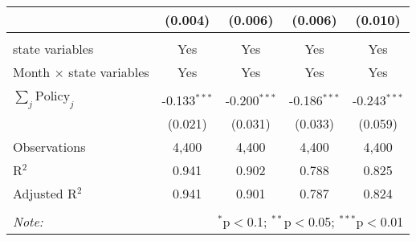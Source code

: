\begin{tabular}{@{\extracolsep{1pt}}lcccc}
  & (0.004) & (0.006) & (0.006) & (0.010) \\ 
 \hline \\[-1.8ex] 
state variables & Yes & Yes & Yes & Yes \\ 
Month $\times$ state variables & Yes & Yes & Yes & Yes \\ 
\hline \\[-1.8ex] 
$\sum_j \mathrm{Policy}_j$ & -0.133$^{***}$ & -0.200$^{***}$ & -0.186$^{***}$ & -0.243$^{***}$ \\ 
 & (0.021) & (0.031) & (0.033) & (0.059) \\ 
Observations & 4,400 & 4,400 & 4,400 & 4,400 \\ 
R$^{2}$ & 0.941 & 0.902 & 0.788 & 0.825 \\ 
Adjusted R$^{2}$ & 0.941 & 0.901 & 0.787 & 0.824 \\ 
\hline 
\hline \\[-1.8ex] 
\textit{Note:}  & \multicolumn{4}{r}{$^{*}$p$<$0.1; $^{**}$p$<$0.05; $^{***}$p$<$0.01} \\ 
\end{tabular} 